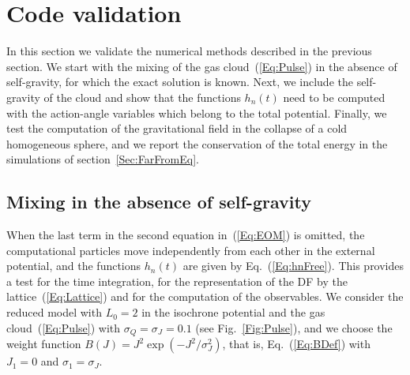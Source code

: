 \section{Code validation}
\label{Sec:Validation}

In this section we validate the numerical methods described in the previous section. We start with the mixing of the gas cloud~(\ref{Eq:Pulse}) in the absence of self-gravity, for which the exact solution is known. Next, we include the self-gravity of the cloud and show that the functions $h_n(t)$ need to be computed with the action-angle variables which belong to the total potential. Finally, we test the computation of the gravitational field in the collapse of a cold homogeneous sphere, and we report the conservation of the total energy in the simulations of section~\ref{Sec:FarFromEq}.


\subsection{Mixing in the absence of self-gravity}
\label{SubSec:ValFree}

When the last term in the second equation in~(\ref{Eq:EOM}) is omitted, the computational particles move independently from each other in the external potential, and the functions $h_n(t)$ are given by Eq.~(\ref{Eq:hnFree}). This provides a test for the time integration, for the representation of the DF by the lattice~(\ref{Eq:Lattice}) and for the computation of the observables. We consider the reduced model with $L_0 = 2$ in the isochrone potential and the gas cloud~(\ref{Eq:Pulse}) with $\sigma_Q = \sigma_J = 0.1$ (see Fig.~\ref{Fig:Pulse}), and we choose the weight function $B(J) = J^2\exp(-J^2/\sigma_J^2)$, that is, Eq.~(\ref{Eq:BDef}) with $J_1 = 0$ and $\sigma_1 = \sigma_J$.

